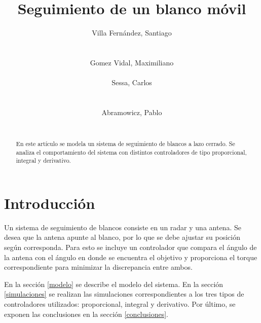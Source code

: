 \documentclass{sig-alternate}
\begin{document}
\title{Seguimiento de un blanco m\'{o}vil}


\author{
    \alignauthor
    Villa Fern\'{a}ndez, Santiago\\
     \\
    \ \\
    Gomez Vidal, Maximiliano\\
     \\
    \alignauthor
    Sessa, Carlos\\
     \\
    \ \\
    Abramowicz, Pablo\\
     \\
}

\maketitle

\begin{abstract}
En este art\'{i}culo se modela un sistema de seguimiento de blancos a lazo 
cerrado. Se analiza el comportamiento del sistema con distintos controladores
de tipo proporcional, integral y derivativo.
\end{abstract}


\section{Introducci\'{o}n}\label{introduccion}
Un sistema de seguimiento de blancos consiste en un radar y una antena.
Se desea que la antena apunte al blanco, por lo que se debe ajustar su 
posici\'{o}n  seg\'{u}n corresponda. Para esto se incluye un controlador que 
compara el \'{a}ngulo de la antena con el \'{a}ngulo en donde se encuentra el 
objetivo y proporciona el torque correspondiente para minimizar la discrepancia 
entre ambos.

En la secci\'{o}n \ref{modelo} se describe el modelo del sistema. En la
secci\'{o}n \ref{simulaciones} se realizan las simulaciones correspondientes
a los tres tipos de controladores utilizados: proporcional, integral y 
derivativo. Por \'{u}ltimo, se exponen las conclusiones en la secci\'{o}n
\ref{conclusiones}.
\end{document}
